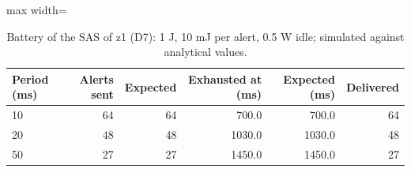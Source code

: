 \begin{table}[htbp]
\centering
\caption{Battery of the SAS of z1 (D7): 1 J, 10 mJ per alert, 0.5 W idle; simulated against analytical values.}
\label{tab:battery}
\begin{adjustbox}{max width=\textwidth}
\begin{tabular}{lrrrrr}
\toprule
Period (ms) & Alerts sent & Expected & Exhausted at (ms) & Expected (ms) & Delivered \\
\midrule
10 & 64 & 64 & 700.0 & 700.0 & 64 \\
20 & 48 & 48 & 1030.0 & 1030.0 & 48 \\
50 & 27 & 27 & 1450.0 & 1450.0 & 27 \\
\bottomrule
\end{tabular}
\end{adjustbox}
\end{table}
